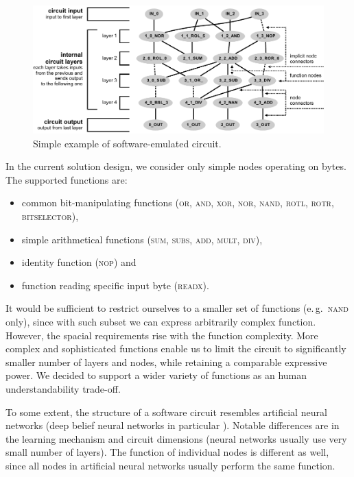 \documentclass[12pt,oneside]{fithesis2}		%
\renewcommand{\_}{\leavevmode \kern0.0em\vbox{\hrule width0.4em}}
\newcommand{\squarebullet}{\textcolor{black}{\raisebox{0.15em}{\rule{4pt}{4pt}}}}
\newenvironment{myItemize}{
  \begin{itemize}[leftmargin=2em,rightmargin=1em,itemsep=\parskip ,parsep=0em,topsep=0em,partopsep=0em]
  \renewcommand{\labelitemi}{\squarebullet}
  \renewcommand{\labelitemii}{$\diamond$}
}{
  \end{itemize}
}
\begin{document}
\begin{figure}[t!]
\centering
\includegraphics[width=\textwidth]{images/circuit-final}
\caption{Simple example of software-emulated circuit.}
\label{fig:circuit-example}
\end{figure}

In the current solution design, we consider only simple nodes operating on bytes. The supported functions are:
\begin{myItemize}
\item common bit-manipulating functions (\textsc{or, and, xor, nor, nand, rotl, rotr, bitselector}),
\item simple arithmetical functions (\textsc{sum, subs, add, mult, div}),
\item identity function (\textsc{nop}) and
\item function reading specific input byte (\textsc{readx}).
\end{myItemize}

\noindent
It would be sufficient to restrict ourselves to a smaller set of functions (e.\,g.\ \textsc{nand} only),
since with such subset we can express arbitrarily complex function. However, the spacial requirements rise with the function
complexity. More complex and sophisticated functions enable us to limit the circuit to significantly smaller number of 
layers and nodes, while retaining a comparable expressive power.
We decided to support a wider variety of functions as an human understandability trade-off.

To some extent, the structure of a software circuit resembles artificial neural networks 
(deep belief neural networks in particular \parencite{neural-networks}). Notable differences are in
the learning mechanism and circuit dimensions (neural networks usually use very small number of layers). 
The function of individual nodes is different as well, since all nodes in artificial neural networks usually perform the same function.
\end{document}
